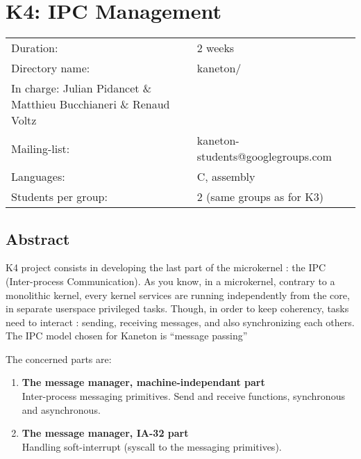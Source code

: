 
%
%

\chapter{K4: IPC Management}

%
%

\begin{tabular}{p{7cm}l}
Duration: & 2 weeks \\
Directory name: & kaneton/ \\
In charge: Julian Pidancet \& Matthieu Bucchianeri \& Renaud Voltz\\
Mailing-list: & kaneton-students@googlegroups.com \\
Languages: & C, assembly \\
Students per group: & 2 (same groups as for K3) \\
\end{tabular}

\section{Abstract}

K4 project consists in developing the last part of the microkernel : the
IPC (Inter-process Communication). As you know, in a microkernel, contrary
to a monolithic kernel, every kernel services are running independently
from the core, in separate userspace privileged tasks. Though, in order
to keep coherency, tasks need to interact : sending, receiving messages,
and also synchronizing each others. The IPC model chosen for Kaneton is
``message passing''

The concerned parts are:

\begin{enumerate}
  \item
    {\bf The message manager, machine-independant part}\\
    Inter-process messaging primitives. Send and receive functions,
    synchronous and asynchronous.
  \item
    {\bf The message manager, IA-32 part}\\
    Handling soft-interrupt (syscall to the messaging primitives).
\end{enumerate}

